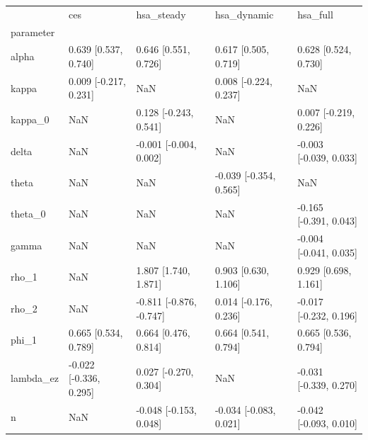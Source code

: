 \begin{tabular}{lllll}
\toprule
 & ces & hsa\_steady & hsa\_dynamic & hsa\_full \\
parameter &  &  &  &  \\
\midrule
alpha & 0.639 [0.537, 0.740] & 0.646 [0.551, 0.726] & 0.617 [0.505, 0.719] & 0.628 [0.524, 0.730] \\
kappa & 0.009 [-0.217, 0.231] & NaN & 0.008 [-0.224, 0.237] & NaN \\
kappa\_0 & NaN & 0.128 [-0.243, 0.541] & NaN & 0.007 [-0.219, 0.226] \\
delta & NaN & -0.001 [-0.004, 0.002] & NaN & -0.003 [-0.039, 0.033] \\
theta & NaN & NaN & -0.039 [-0.354, 0.565] & NaN \\
theta\_0 & NaN & NaN & NaN & -0.165 [-0.391, 0.043] \\
gamma & NaN & NaN & NaN & -0.004 [-0.041, 0.035] \\
rho\_1 & NaN & 1.807 [1.740, 1.871] & 0.903 [0.630, 1.106] & 0.929 [0.698, 1.161] \\
rho\_2 & NaN & -0.811 [-0.876, -0.747] & 0.014 [-0.176, 0.236] & -0.017 [-0.232, 0.196] \\
phi\_1 & 0.665 [0.534, 0.789] & 0.664 [0.476, 0.814] & 0.664 [0.541, 0.794] & 0.665 [0.536, 0.794] \\
lambda\_ez & -0.022 [-0.336, 0.295] & 0.027 [-0.270, 0.304] & NaN & -0.031 [-0.339, 0.270] \\
n & NaN & -0.048 [-0.153, 0.048] & -0.034 [-0.083, 0.021] & -0.042 [-0.093, 0.010] \\
\bottomrule
\end{tabular}
